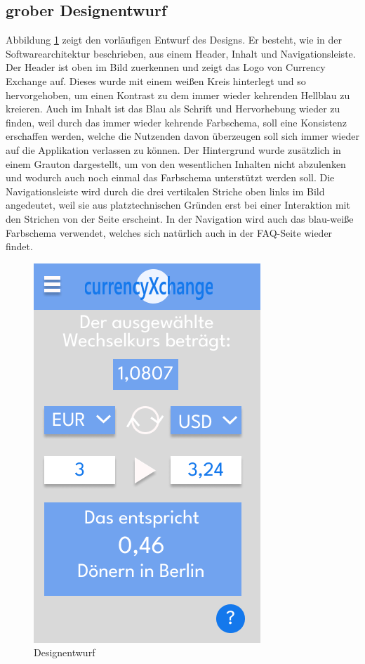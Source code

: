 \documentclass[conference]{IEEEtran}
\begin{document}
\subsection{grober Designentwurf}
Abbildung \ref{fig:designentwurf} zeigt den vorläufigen Entwurf des Designs. Er besteht, wie in der Softwarearchitektur beschrieben, aus einem Header, Inhalt und Navigationsleiste. Der Header ist oben im Bild zuerkennen und zeigt das Logo von Currency Exchange auf. Dieses wurde mit einem weißen Kreis hinterlegt und so hervorgehoben, um einen Kontrast zu dem immer wieder kehrenden Hellblau zu kreieren. Auch im Inhalt ist das Blau als Schrift und Hervorhebung wieder zu finden, weil durch das immer wieder kehrende Farbschema, soll eine Konsistenz erschaffen werden, welche die Nutzenden davon überzeugen soll sich immer wieder auf die Applikation verlassen zu können. Der Hintergrund wurde zusätzlich in einem Grauton dargestellt, um von den wesentlichen Inhalten nicht abzulenken und wodurch auch noch einmal das Farbschema unterstützt werden soll. Die Navigationsleiste wird durch die drei vertikalen Striche oben links im Bild angedeutet, weil sie aus platztechnischen Gründen erst bei einer Interaktion mit den Strichen von der Seite erscheint. In der Navigation wird auch das blau-weiße Farbschema verwendet, welches sich natürlich auch in der FAQ-Seite wieder findet.
\begin{figure}[h]
	\centering
	\includegraphics[width=0.5\linewidth, frame]{designentwurf}
	\caption[Designentwurf]{Designentwurf}
	\label{fig:designentwurf}
\end{figure}
\end{document}
